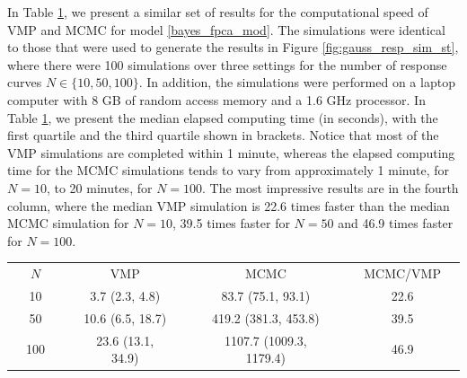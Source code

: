 \documentclass[12pt]{article}
\theoremstyle{plain}
\theoremstyle{definition}
\theoremstyle{remark}
\begin{document}
In Table \ref{tab:speed_comp}, we present a similar set of results for the computational speed of VMP and MCMC
for model \eqref{bayes_fpca_mod}. The simulations were identical to those that were used to generate the
results in Figure \ref{fig:gauss_resp_sim_st}, where there were 100 simulations over three settings for the number
of response curves $N \in \{10, 50, 100\}$. In addition, the simulations were performed on a laptop computer
with 8 GB of random access memory and a 1.6 GHz processor. In Table \ref{tab:speed_comp},
we present the median elapsed computing time (in seconds),
with the first quartile and the third quartile shown in brackets.
Notice that most of the VMP simulations are completed within 1 minute, whereas the elapsed computing time
for the MCMC simulations tends to vary from approximately 1 minute, for $N = 10$, to 20 minutes, for $N = 100$.
The most impressive results are in the fourth column, where the median VMP simulation is 22.6 times faster
than the median MCMC simulation for $N = 10$, 39.5 times faster for $N = 50$ and 46.9 times faster for $N = 100$.

\begin{table}
\begin{center}
\begin{tcolorbox}[size=tight,on line,left=0mm,right=0mm,width=0.9\textwidth,bottom=0mm,top=1mm,arc=0mm,outer arc=0pt, box align=center,boxrule=1.5pt]
\captionsetup{width=0.9\textwidth}
\begin{tabularx}{\textwidth}{X c X | X c X | X c X | X c X}
  \rowcolor[gray]{.8}
  & $N$ & & & VMP & & & MCMC & & & MCMC/VMP & \\
  \rowcolor{white!50}
  & 10 & & & 3.7 (2.3, 4.8) & & & 83.7 (75.1, 93.1) & & & 22.6 & \\
  \rowcolor{white!50}
  & 50 & & & 10.6 (6.5, 18.7) & & & 419.2 (381.3, 453.8) & & & 39.5 & \\
  \rowcolor{white!50}
  & 100 & & & 23.6 (13.1, 34.9) & & & 1107.7 (1009.3, 1179.4) & & & 46.9 & \\
\end{tabularx}
\label{tab:speed_comp}
\end{tcolorbox}
\end{center}
\end{table}
\end{document}
